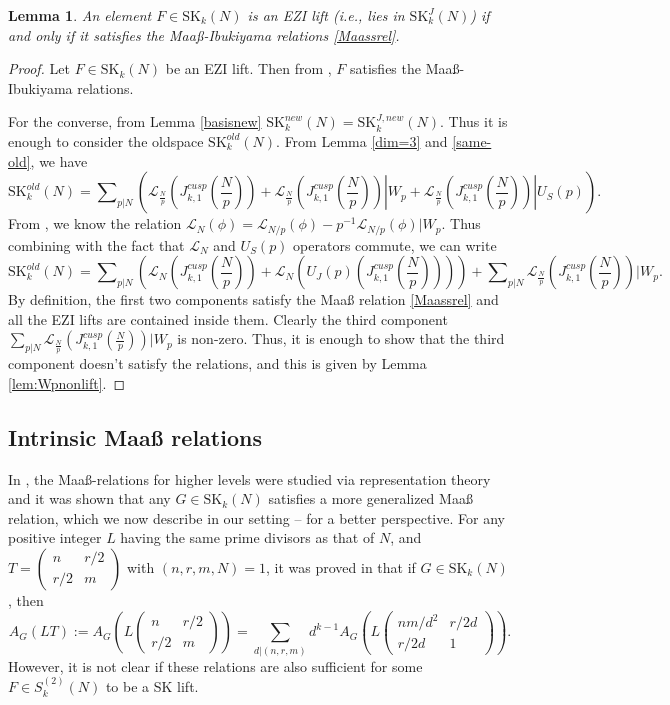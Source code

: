 \documentclass[11pt]{amsart}
\numberwithin{equation}{section}
\theoremstyle{plain}
\newtheorem{lem}[thm]{Lemma}
\theoremstyle{definition}
\newcommand{\mc}{\mathcal}
\newcommand{\mrm}{\mathrm}
\newcommand{\sumn}{\sum \nolimits}
\newcommand{\smat}[4]{\left( \begin{smallmatrix}#1&#2\\#3&#4\end{smallmatrix}\right)}
\newcommand{\sktwon}{S_k^{(2)}(N)}
\newcommand{\skk}{\mrm{SK}_k}
\newcommand{\skkn}{\mrm{SK}_k(N)}
\begin{document}
\begin{lem} \label{ezi-charac}
    An element $F \in \skkn$ is an EZI lift (i.e., lies in $\mrm{SK}_k^J(N)$) if and only if it satisfies the Maa{\ss}-Ibukiyama relations \eqref{Maassrel}.
\end{lem}
\begin{proof}
    Let $F \in \skkn$ be an EZI lift. Then from \cite{heim2017maass}, $F$ satisfies the Maa{\ss}-Ibukiyama relations.

    For the converse, from Lemma \ref{basisnew} $ \skk^{new}(N) = \skk^{J,new}(N)$. Thus it is enough to consider the oldspace $\skk^{old}(N)$. From Lemma \ref{dim=3} and \ref{same-old}, we have 
    \begin{equation}
        \skk^{old}(N) =\sumn_{p|N} \left( \mc L_{\frac{N}{p}}(J_{k,1}^{cusp}(\frac{N}{p})) + \mc L_{\frac{N}{p}}(J_{k,1}^{cusp}(\frac{N}{p})) | W_p + \mc L_{\frac{N}{p}}(J_{k,1}^{cusp}(\frac{N}{p})) | U_S(p)\right).
    \end{equation}
From \cite{Ibu-SK}, we know the relation $\mc L_N (\phi)= \mc L_{N/p}(\phi)-p^{-1}\mc L_{N/p}(\phi)|W_p $. Thus combining with the fact that $\mc L_N$ and $U_S(p)$ operators commute, we can write
\begin{equation}
    \skk^{old}(N) =\sumn_{p|N}\left( \mc L_N(J_{k,1}^{cusp}(\frac{N}{p})) +  \mc L_N(U_J(p)(J_{k,1}^{cusp}(\frac{N}{p}))) \right)+\sumn_{p|N}\mc L_{\frac{N}{p}}(J_{k,1}^{cusp}(\frac{N}{p})) | W_p.
\end{equation}
By definition, the first two components satisfy the Maa{\ss} relation \eqref{Maassrel} and all the EZI lifts are contained inside them. Clearly the third component $\sum_{p|N}\mc L_{\frac{N}{p}}(J_{k,1}^{cusp}(\frac{N}{p})) | W_p$ is non-zero. Thus, it is enough to show that the third component doesn't satisfy the relations, and this is given by Lemma \ref{lem:Wpnonlift}. 
\end{proof}

\subsection{Intrinsic Maa{\ss} relations} \label{intr-maass}
In \cite{marzec2021maass}, the Maa{\ss}-relations for higher levels were studied via representation theory and
it was shown that any $G\in \skkn$ satisfies a more generalized  Maa{\ss} relation, which we now describe in our setting -- for a better perspective. For any positive integer $L$ having the same prime divisors as that of $N$,  and $T=\smat{n}{r/2}{r/2}{m}$ with $(n,r,m, N)=1$, it was proved in \cite{marzec2021maass} that if $G\in \skkn$, then
\begin{equation}\label{genMaassrel}
       A_G(LT):= A_G\left(L\smat{n}{r/2}{r/2}{m}\right)= \sum_{d|(n,r,m)} d^{k-1} A_G\left(L\smat{nm/d^2}{r/2d}{r/2d}{1}\right).
\end{equation}
However, it is not clear if these relations are also sufficient for some $F \in \sktwon$ to be a SK lift.
\end{document}
